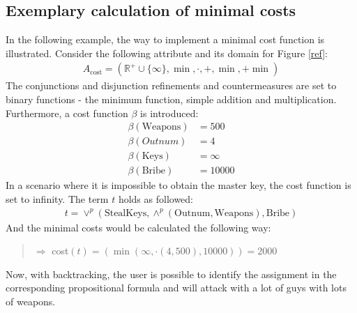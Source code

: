 \documentclass[conference]{IEEEtran}
\begin{document}
\subsection{Exemplary calculation of minimal costs}
In the following example, the way to implement a minimal cost function is illustrated. Consider the following attribute and its domain for Figure \ref{ref}:
\begin{align*}
	A_{\text{cost}} = \left(\mathbb{R}^+\cup\{\infty\},\min,\cdot,+,\min,+\min\right)
\end{align*}
The conjunctions and disjunction refinements and countermeasures are set to binary functions - the minimum function, simple addition and multiplication. Furthermore, a cost function $\beta$ is introduced:
\begin{align*}
\beta(\text{Weapons}) &= 500\\
\beta(Outnum) &= 4\\
\beta(\text{Keys}) &= \infty\\
\beta(\text{Bribe}) &= 10000
\end{align*}
In a scenario where it is impossible to obtain the master key, the cost function is set to infinity. The term $t$ holds as followed:
\begin{align*}
t = \vee^p \left( \text{StealKeys}, \wedge^p \left( \text{Outnum},\text{Weapons} \right), \text{Bribe}  \right)
\end{align*}
And the minimal costs would be calculated the following way:
\begin{quotation}
	$\Rightarrow$ cost$(t)= \left( \min \left( \infty, \cdot \left( 4,500\right), 10000 \right)  \right) = 2000$
\end{quotation}
Now, with backtracking, the user is possible to identify the assignment in the corresponding propositional formula and will attack with a lot of guys with lots of weapons.
\end{document}
